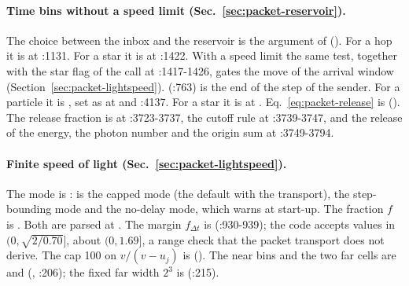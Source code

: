 \paragraph{Time bins without a speed limit (Sec.~\ref{sec:packet-reservoir}).}
The choice between the inbox and the reservoir is the argument
 of 
(). For a hop it is
 at :1131. For a star it is
 at :1422. With a speed limit the same
test, together with the star flag of the call at :1417-1426, gates the move of the
arrival window (Section~\ref{sec:packet-lightspeed}). 
(:763) is the end of the step of the sender. For a particle it is
, set as  at
 and :4137. For a star it is
 at .
Eq.~\eqref{eq:packet-release} is 
(). The release fraction is at :3723-3737,
the cutoff rule at :3739-3747, and the release of the energy, the photon number
and the origin sum at :3749-3794.

\paragraph{Finite speed of light (Sec.~\ref{sec:packet-lightspeed}).} The mode
is :  is the capped
mode (the default with the transport),  the step-bounding mode and
 the no-delay mode, which warns at start-up. The fraction $f$
is . Both are
parsed at .
The margin $f_{\Delta t}$ is
(:930-939); the code accepts values in $(0,\sqrt{2/0.70}]$, about $(0,1.69]$,
a range check that the packet transport does not derive. The cap 100 on
$v/(v-u_j)$ is 
(). The near bins and the two far cells are
 and 
(, :206); the fixed far width $2^3$ is
 (:215).

